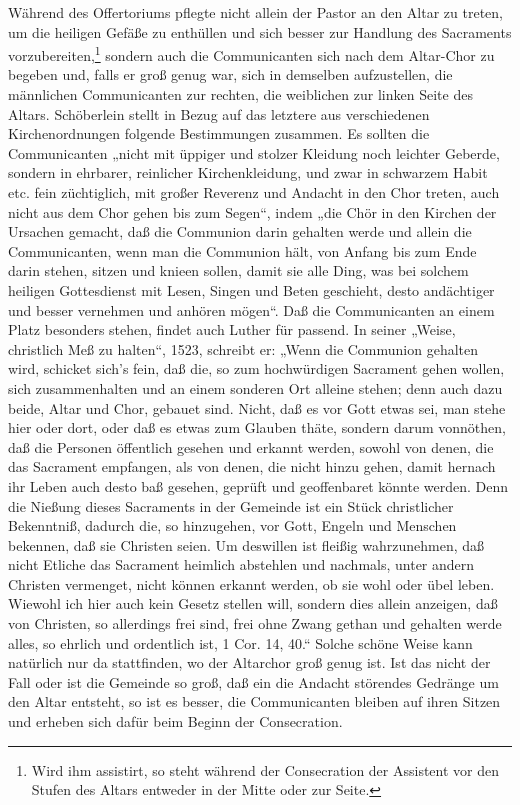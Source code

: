 Während des Offertoriums pflegte nicht allein der Pastor an den Altar zu treten, um die heiligen Gefäße zu enthüllen und sich besser zur Handlung des Sacraments vorzubereiten,\footnote{Wird ihm assistirt, so steht während der Consecration der Assistent vor den Stufen des Altars entweder in der Mitte oder zur Seite.} sondern auch die Communicanten sich nach dem
Altar-Chor zu begeben und, falls er groß genug war, sich in demselben aufzustellen, die männlichen Communicanten zur rechten, die weiblichen zur linken Seite des Altars. Schöberlein stellt in Bezug auf das letztere aus verschiedenen Kirchenordnungen folgende Bestimmungen zusammen. Es sollten die Communicanten „nicht mit üppiger und stolzer Kleidung noch leichter Geberde, sondern in ehrbarer, reinlicher Kirchenkleidung, und zwar in schwarzem Habit etc. fein züchtiglich, mit großer Reverenz und Andacht in den Chor treten, auch nicht aus dem Chor gehen bis zum Segen“, indem „die Chör in den Kirchen der Ursachen gemacht, daß die Communion darin gehalten werde und allein die Communicanten, wenn man die Communion hält, von Anfang bis zum Ende darin stehen, sitzen und knieen sollen, damit sie alle Ding, was bei solchem heiligen Gottesdienst mit Lesen, Singen und Beten geschieht, desto andächtiger und besser vernehmen und anhören mögen“. Daß die Communicanten an einem Platz besonders stehen, findet auch Luther für passend. In seiner „Weise, christlich Meß zu halten“, 1523, schreibt er: „Wenn die Communion gehalten wird, schicket sich’s fein, daß die, so zum hochwürdigen Sacrament gehen wollen, sich zusammenhalten und an einem sonderen Ort alleine stehen; denn auch dazu beide, Altar und Chor, gebauet sind. Nicht, daß es vor Gott etwas sei, man stehe hier oder dort, oder daß es etwas zum Glauben thäte, sondern darum vonnöthen, daß die Personen öffentlich gesehen und erkannt werden, sowohl von denen, die das Sacrament empfangen, als von denen, die nicht hinzu gehen, damit hernach ihr Leben auch desto baß gesehen, geprüft und geoffenbaret könnte werden. Denn die Nießung dieses Sacraments in der Gemeinde ist ein Stück christlicher Bekenntniß, dadurch die, so hinzugehen, vor Gott, Engeln und Menschen bekennen, daß sie Christen seien. Um deswillen ist fleißig wahrzunehmen, daß nicht Etliche das Sacrament heimlich abstehlen und nachmals, unter andern Christen vermenget, nicht können erkannt werden, ob sie wohl oder übel leben. Wiewohl ich hier auch kein Gesetz stellen will, sondern dies allein anzeigen, daß von Christen, so allerdings frei sind, frei ohne Zwang gethan und gehalten werde alles, so ehrlich und ordentlich ist, 1 Cor. 14, 40.“ Solche schöne Weise kann natürlich nur da stattfinden, wo der Altarchor groß genug ist. Ist das nicht der Fall oder ist die Gemeinde so groß, daß ein die Andacht störendes Gedränge um den Altar entsteht, so ist es besser, die Communicanten bleiben auf ihren Sitzen und erheben sich dafür beim Beginn der Consecration.

